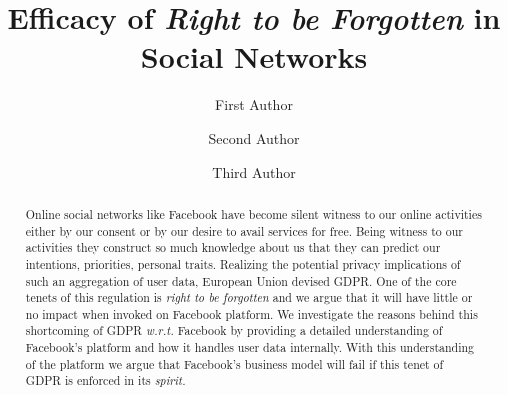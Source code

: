 \documentclass[runningheads]{llncs}
\begin{document}
%
\title{Efficacy of \textit{Right to be Forgotten} in Social Networks}
%
%
\author{First Author \and
Second Author \and
Third Author}
\author{}
%
%
%
\maketitle              %
%
\begin{abstract}
  Online social networks like Facebook have become silent witness to
  our online activities either by our consent or by our desire to
  avail services for free. Being witness to our activities they
  construct so much knowledge about us that they can predict our
  intentions, priorities, personal traits. Realizing the potential
  privacy implications of such an aggregation of user data, European
  Union devised GDPR. One of the core tenets of this regulation is
  \textit{right to be forgotten} and we argue that it will have little
  or no impact when invoked on Facebook platform. We investigate the
  reasons behind this shortcoming of GDPR \textit{w.r.t.} Facebook by
  providing a detailed understanding of Facebook's platform and how it
  handles user data internally. With this understanding of the
  platform we argue that Facebook's business model will fail if this
  tenet of GDPR is enforced in its \textit{spirit.}


\end{abstract}

\end{document}
